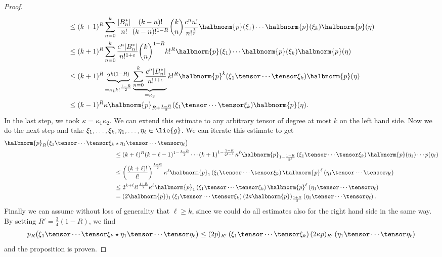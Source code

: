 \documentclass[
11pt,                          %
english                        %
]{article}
\begin{document}
\begin{proof}
\begin{align*}
		& \leq
		(k + 1)^R
		\sum\limits_{n = 0}^k
		\frac{|B_n^*|}{n!}
		\frac{(k-n)!}{(k-n)!^{1 - R}}
		\binom{k}{n}
		\frac{c^n n!}{n!^{\frac{1}{p}}}
		\halbnorm{p}(\xi_1) \cdots \halbnorm{p}(\xi_k)
		\halbnorm{p}(\eta)
		\\
		& \leq
		(k + 1)^R
		\sum\limits_{n = 0}^k
		\frac{c^n |B_n^*|}{n!^{1 + \varepsilon}}
		\binom{k}{n}^{1-R}
		k!^R
		\halbnorm{p}(\xi_1) \cdots \halbnorm{p}(\xi_k) 
		\halbnorm{p}(\eta)
		\\
		& \leq
		(k + 1)^R
		\underbrace{
			2^{k (1-R)}
		}_{
			=\kappa_1 k!^{\frac{1-R}{2}}
		}
		\underbrace{
			\sum\limits_{n = 0}^k
			\frac{c^n |B_n^*|}{n!^{1 + \varepsilon}}
		}_{
			= \kappa_2
		}
		k!^R
		\halbnorm{p}^k(\xi_1 \tensor \cdots \tensor \xi_k) 
		\halbnorm{p}(\eta)
		\\
		& \leq
		(k-1)^R
		\kappa
		\halbnorm{p}_{R + \frac{1-R}{2}}
		(\xi_1 \tensor \cdots \tensor \xi_k)
		\halbnorm{p}(\eta).
	\end{align*}
	In the last step, we took $\kappa = \kappa_1 \kappa_2$. We can extend this 
	estimate to any arbitrary tensor of degree at most $k$ on the left hand side.
	Now we do the next step and take $\xi_1, \ldots, \xi_k, \eta_1, \ldots, 
	\eta_\ell \in \lie{g}$. We can iterate this estimate to get
	\begin{align*}
		\halbnorm{p}_R \big(
			\xi_1 \tensor \cdots \tensor \xi_k
		&
			\star
			\eta_1 \tensor \cdots \tensor \eta_\ell
		\big)
		\\
		& \leq
		(k + \ell)^R (k + \ell - 1)^{1 - \frac{1 - R}{2}}
		\cdots (k+1)^{{1 - \frac{1 - R}{2^{\ell - 1}}}}
		\kappa^\ell
		\halbnorm{p}_{1 - \frac{1-R}{2^\ell}}
		\left( \xi_1 \tensor \cdots \tensor \xi_k \right)
		\halbnorm{p}(\eta_1) \cdots p(\eta_\ell)
		\\
		& \leq
		\left( \frac{(k+\ell)!}{\ell!} \right)^{\frac{1 + R}{2}}
		\kappa^\ell
		\halbnorm{p}_1 \left( \xi_1 \tensor \cdots \tensor \xi_k \right)
		\halbnorm{p}^\ell \left( \eta_1 \tensor \cdots \tensor \eta_\ell \right)
		\\
		& \leq
		2^{k + \ell}
		\ell!^{\frac{1 + R}{2}}
		\kappa^\ell
		\halbnorm{p}_1 \left( \xi_1 \tensor \cdots \tensor \xi_k \right)
		\halbnorm{p}^\ell \left( \eta_1 \tensor \cdots \tensor \eta_\ell \right)
		\\
		&=
		(2 \halbnorm{p})_1 \left( \xi_1 \tensor \cdots \tensor \xi_k \right)
		(2 \kappa \halbnorm{p})_{\frac{1 + R}{2}} 
		\left( \eta_1 \tensor \cdots \tensor \eta_\ell \right).
	\end{align*}
	Finally we can assume without loss of generality that $\ell \geq k$, since
	we could do all estimates also for the right hand side in the same way.
	By setting $R' = \frac{3}{4}(1-R)$, we find
	\begin{equation*}
		p_R \big(
			\xi_1 \tensor \cdots \tensor \xi_k
			\star
			\eta_1 \tensor \cdots \tensor \eta_\ell
		\big)
		\leq
		(2p)_{R'}
		\left( \xi_1 \tensor \cdots \tensor \xi_k \right)
		(2 \kappa p)_{R'}
		\left( \eta_1 \tensor \cdots \tensor \eta_\ell \right)
	\end{equation*}
	and the proposition is proven.
\end{proof}
\end{document}
